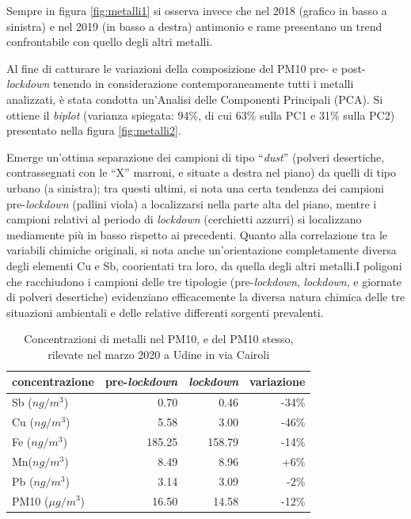 Sempre in figura \ref{fig:metalli1} si osserva invece che nel 2018 (grafico in basso a sinistra) e nel 2019 (in basso a destra) antimonio e rame presentano un trend confrontabile con quello degli altri metalli.

Al fine di catturare le variazioni della composizione del PM10 pre- e post-\textit{lockdown} tenendo in considerazione contemporaneamente tutti  i metalli analizzati, è stata condotta un’Analisi delle Componenti Principali (PCA). Si ottiene il \textit{biplot} (varianza spiegata: 94\%, di cui 63\% sulla PC1 e 31\% sulla PC2) presentato nella figura \ref{fig:metalli2}.

Emerge un’ottima separazione dei campioni di tipo “\textit{dust}” (polveri desertiche, contrassegnati con le “X” marroni, e situate a destra nel piano) da quelli di tipo urbano (a sinistra); tra questi ultimi, si nota una certa tendenza dei campioni pre-\textit{lockdown} (pallini viola) a localizzarsi nella parte alta del piano, mentre i campioni relativi al periodo di \textit{lockdown} (cerchietti azzurri) si localizzano mediamente più in basso rispetto ai precedenti. Quanto alla correlazione tra le variabili chimiche originali, si nota anche un’orientazione completamente diversa degli elementi Cu e Sb, coorientati tra loro, da quella degli altri metalli.I poligoni che racchiudono i campioni delle tre tipologie (pre-\textit{lockdown}, \textit{lockdown}, e giornate di polveri desertiche) evidenziano efficacemente la diversa natura chimica delle tre situazioni ambientali e delle relative differenti sorgenti prevalenti.

\begin{table}[ht]
    \centering
    \begin{tabular}{lrrr}
    \toprule
concentrazione&	pre-\textit{lockdown}&	\textit{lockdown}&	variazione\\
\midrule
Sb ($ng/m^3$)&	0.70	&0.46	&-34\%\\
Cu ($ng/m^3$)&	5.58	&3.00	&-46\%\\
Fe ($ng/m^3$)&	185.25	&158.79	&-14\%\\
Mn($ng/m^3$)&	8.49	&8.96	&+6\%\\
Pb ($ng/m^3$)&	3.14	&3.09	&-2\%\\
PM10 ($\mu g/m^3$)&	16.50&	14.58	&-12\%\\
\bottomrule
    \end{tabular}
    \caption[Concentrazioni di metalli nel PM10, rilevate nel marzo 2020 a Udine]{Concentrazioni di metalli nel PM10, e del PM10 stesso, rilevate nel marzo 2020 a Udine in via Cairoli}
    \label{tab:metalli}
\end{table}


